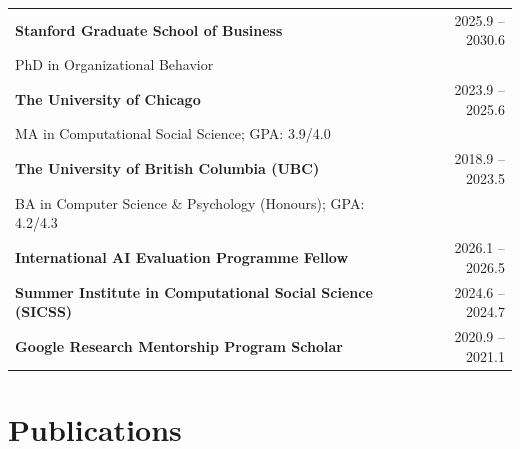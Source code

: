 \documentclass[11pt,letterpaper]{article}
\newcommand{\institution}[1]{\textcolor{linkblue}{\textbf{#1}}}
\begin{document}
\noindent
\begin{tabularx}{\textwidth}{Xr}
\institution{Stanford Graduate School of Business} & 2025.9 -- 2030.6 \\
\quad PhD in Organizational Behavior & \\[0.5em]
\institution{The University of Chicago} & 2023.9 -- 2025.6 \\
\quad MA in Computational Social Science; GPA: 3.9/4.0 & \\[0.5em]
\institution{The University of British Columbia (UBC)} & 2018.9 -- 2023.5 \\
\quad BA in Computer Science \& Psychology (Honours); GPA: 4.2/4.3 & \\[0.5em]
\institution{International AI Evaluation Programme Fellow} & 2026.1 -- 2026.5 \\[0.5em]
\institution{Summer Institute in Computational Social Science (SICSS)} & 2024.6 -- 2024.7 \\[0.5em]
\institution{Google Research Mentorship Program Scholar} & 2020.9 -- 2021.1 \\
\end{tabularx}

\section*{Publications}
\end{document}
